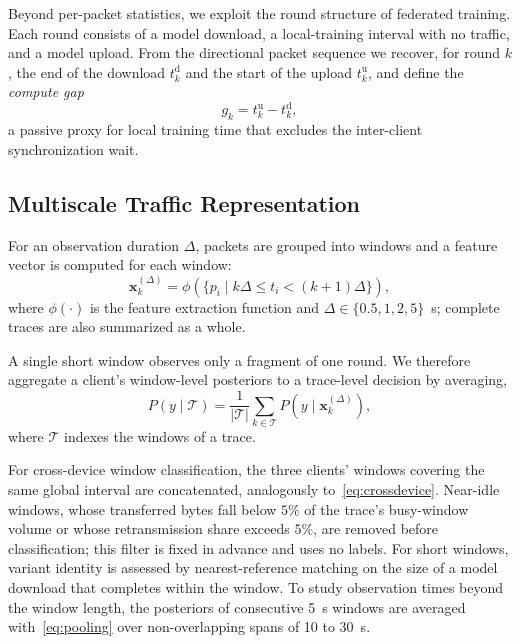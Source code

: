 \documentclass[conference]{IEEEtran}
\begin{document}
Beyond per-packet statistics, we exploit the round structure of federated
training. Each round consists of a model download, a local-training interval
with no traffic, and a model upload. From the directional packet sequence we
recover, for round $k$, the end of the download $t^{\mathrm{d}}_{k}$ and the
start of the upload $t^{\mathrm{u}}_{k}$, and define the \emph{compute gap}
\begin{equation}
g_k = t^{\mathrm{u}}_{k} - t^{\mathrm{d}}_{k},
\label{eq:gap}
\end{equation}
a passive proxy for local training time that excludes the inter-client
synchronization wait.

\subsection{Multiscale Traffic Representation}
\label{subsec:multiscale}
For an observation duration $\Delta$, packets are grouped into windows and a
feature vector is computed for each window:
\begin{equation}
\mathbf{x}_{k}^{(\Delta)}
=
\phi\left(
\{p_i \mid k\Delta \leq t_i < (k+1)\Delta\}
\right),
\label{eq:window_features}
\end{equation}
where $\phi(\cdot)$ is the feature extraction function and
$\Delta \in \{0.5,1,2,5\}$~s; complete traces are also summarized as a whole.

A single short window observes only a fragment of one round. We therefore
aggregate a client's window-level posteriors to a trace-level decision by
averaging,
\begin{equation}
P(y \mid \mathcal{T})
= \frac{1}{|\mathcal{T}|}\sum_{k \in \mathcal{T}}
P\!\left(y \mid \mathbf{x}_k^{(\Delta)}\right),
\label{eq:pooling}
\end{equation}
where $\mathcal{T}$ indexes the windows of a trace.

For cross-device window classification, the three clients' windows covering
the same global interval are concatenated, analogously to~\eqref{eq:crossdevice}.
Near-idle windows, whose transferred bytes fall below $5\%$ of the trace's
busy-window volume or whose retransmission share exceeds $5\%$, are removed
before classification; this filter is fixed in advance and uses no labels.
For short windows, variant identity is assessed by nearest-reference matching on
the size of a model download that completes within the window.
To study observation times beyond the window length, the posteriors of
consecutive 5~s windows are averaged with~\eqref{eq:pooling} over
non-overlapping spans of 10 to 30~s.
\end{document}
